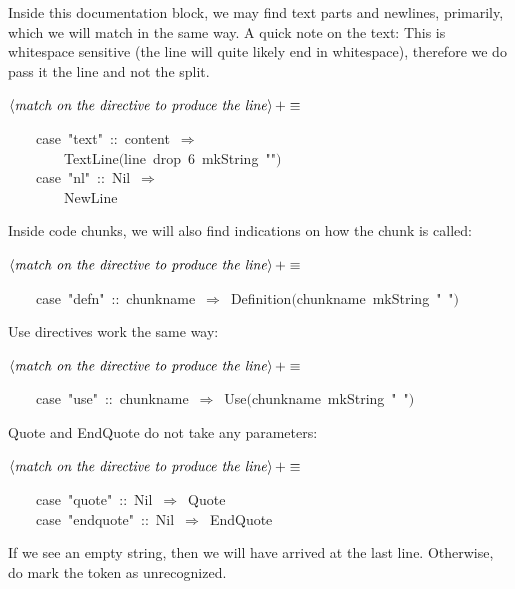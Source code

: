 \documentclass[a4paper,12pt]{article}
\begin{document}
Inside this documentation block, we may find text parts and newlines, primarily,
which we will match in the same way. A quick note on the text: This is whitespace
sensitive (the line will quite likely end in whitespace), therefore we do pass
it the line and not the split.

$\left<\mbox{\emph{match on the directive to produce the line}}\right>+\equiv$
\begin{program}~~~~{\vem case}~"text"~{\rm :}{\rm :}~content~$\Rightarrow$
\\~~~~~~~~TextLine$($line~drop~6~mkString~""$)$
\\~~~~{\vem case}~"nl"~{\rm :}{\rm :}~Nil~$\Rightarrow$
\\~~~~~~~~NewLine
\\[0.5em]\end{program}


Inside code chunks, we will also find indications on how the chunk is called:

$\left<\mbox{\emph{match on the directive to produce the line}}\right>+\equiv$
\begin{program}~~~~{\vem case}~"defn"~{\rm :}{\rm :}~chunkname~$\Rightarrow$~Definition$($chunkname~mkString~"~"$)$
\\[0.5em]\end{program}


Use directives work the same way:

$\left<\mbox{\emph{match on the directive to produce the line}}\right>+\equiv$
\begin{program}~~~~{\vem case}~"use"~{\rm :}{\rm :}~chunkname~$\Rightarrow$~Use$($chunkname~mkString~"~"$)$
\\[0.5em]\end{program}


Quote and EndQuote do not take any parameters:

$\left<\mbox{\emph{match on the directive to produce the line}}\right>+\equiv$
\begin{program}~~~~{\vem case}~"quote"~{\rm :}{\rm :}~Nil~$\Rightarrow$~Quote
\\~~~~{\vem case}~"endquote"~{\rm :}{\rm :}~Nil~$\Rightarrow$~EndQuote
\\[0.5em]\end{program}


If we see an empty string, then we will have arrived at the last line.
Otherwise, do mark the token as unrecognized.
\end{document}
